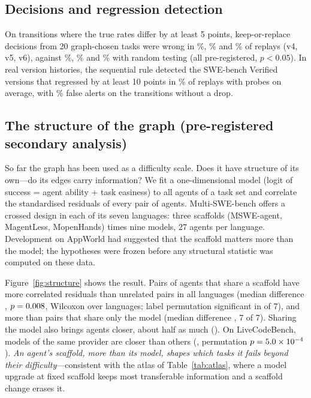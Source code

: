 \documentclass[11pt]{article}
\begin{document}
\subsection{Decisions and regression detection}
On transitions where the true rates differ by at least 5 points, keep-or-replace decisions from 20 graph-chosen
tasks were wrong in \DecGraphFour\%, \DecGraphFive\% and \DecGraphSix\% of replays (v4, v5, v6), against
\DecResetFour\%, \DecResetFive\% and \DecResetSix\% with random testing (all pre-registered, $p<0.05$). In real
version histories, the sequential rule detected the \DetN{} SWE-bench Verified versions that regressed by at least
10 points in \DetPower\% of replays with \DetProbes{} probes on average, with \DetFA\% false alerts on the \DetNok{}
transitions without a drop.

\subsection{The structure of the graph (pre-registered secondary analysis)}\label{sec:structure}
So far the graph has been used as a difficulty scale. Does it have structure of its own---do its edges carry
information? We fit a one-dimensional model (logit of success = agent ability + task easiness) to all agents of a task
set and correlate the standardised residuals of every pair of agents. Multi-SWE-bench offers a crossed design in each
of its seven languages: three scaffolds (MSWE-agent, MagentLess, MopenHands) times nine models, 27 agents per language.
Development on AppWorld had suggested that the scaffold matters more than the model; the hypotheses were frozen before
any structural statistic was computed on these data.

Figure~\ref{fig:structure} shows the result. Pairs of agents that share a scaffold have more correlated residuals than
unrelated pairs in all \SScaffPos{} languages (median difference \SScaffMed, $p=0.008$, Wilcoxon over languages;
label permutation significant in \SPermSig{} of 7), and more than pairs that share only the model (median difference
\SScaffVsModelMed, 7 of 7). Sharing the model also brings agents closer, about half as much (\SModelMed). On
LiveCodeBench, models of the same provider are closer than others (\SProvGap, permutation $p=5.0\times10^{-4}$). \emph{An
agent's scaffold, more than its model, shapes which tasks it fails beyond their difficulty}---consistent with the atlas
of Table~\ref{tab:atlas}, where a model upgrade at fixed scaffold keeps most transferable information and a scaffold
change erases it.
\end{document}
